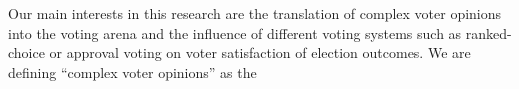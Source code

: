 Our main interests in this research are the translation of complex voter opinions into the voting arena and the influence of different voting systems such as ranked-choice or approval voting on voter satisfaction of election outcomes.
We are defining ``complex voter opinions'' as the 
\\
\\
\\
\\

\cite{hoyer1974comparing}
